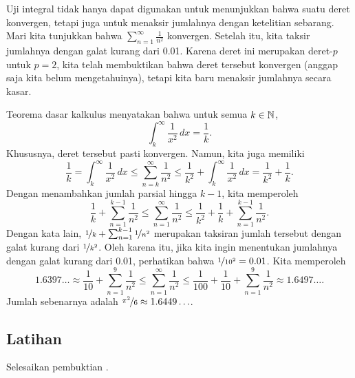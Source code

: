\begin{example}
Uji integral tidak hanya dapat digunakan untuk menunjukkan bahwa suatu deret konvergen, tetapi juga untuk
menaksir jumlahnya dengan ketelitian sebarang.
Mari kita tunjukkan bahwa $\sum_{n=1}^\infty \frac{1}{n^2}$ konvergen.  Setelah itu, kita
taksir jumlahnya dengan galat kurang dari 0.01.  Karena deret ini merupakan deret-$p$ untuk
$p=2$, kita telah membuktikan bahwa deret tersebut konvergen (anggap saja kita belum mengetahuinya),
tetapi kita baru menaksir jumlahnya secara kasar.

Teorema dasar kalkulus menyatakan bahwa untuk semua $k \in {\mathbb{N}}$,
\begin{equation*}
\int_{k}^\infty \frac{1}{x^2}\,dx = \frac{1}{k} .
\end{equation*}
Khususnya, deret tersebut pasti konvergen.  Namun, kita juga memiliki
\begin{equation*}
\frac{1}{k} = \int_k^\infty \frac{1}{x^2}\,dx
\leq
\sum_{n=k}^\infty \frac{1}{n^2}
\leq
\frac{1}{k^2}
+
\int_k^\infty \frac{1}{x^2}\,dx
=
\frac{1}{k^2}
+
\frac{1}{k} .
\end{equation*}
Dengan menambahkan jumlah parsial hingga $k-1$, kita memperoleh
\begin{equation*}
\frac{1}{k} + \sum_{n=1}^{k-1} \frac{1}{n^2}
\leq
\sum_{n=1}^\infty \frac{1}{n^2}
\leq
\frac{1}{k^2}
+
\frac{1}{k} + \sum_{n=1}^{k-1} \frac{1}{n^2} .
\end{equation*}
Dengan kata lain,
$\nicefrac{1}{k} + \sum_{n=1}^{k-1} \nicefrac{1}{n^2}$ merupakan taksiran
jumlah tersebut dengan galat kurang dari $\nicefrac{1}{k^2}$.  Oleh karena itu, jika kita ingin
menentukan jumlahnya dengan galat kurang dari 0.01, perhatikan bahwa $\nicefrac{1}{{10}^2} = 0.01$.  Kita
memperoleh
\begin{equation*}
1.6397\ldots
\approx
\frac{1}{10} + \sum_{n=1}^{9} \frac{1}{n^2}
\leq
\sum_{n=1}^\infty \frac{1}{n^2}
\leq
\frac{1}{100}
+
\frac{1}{10} + \sum_{n=1}^{9} \frac{1}{n^2}
\approx
1.6497\ldots .
\end{equation*}
Jumlah sebenarnya adalah $\nicefrac{\pi^2}{6} \approx 1.6449\ldots$.
\end{example}

\subsection{Latihan}

\begin{exercise}
Selesaikan pembuktian .
\end{exercise}

